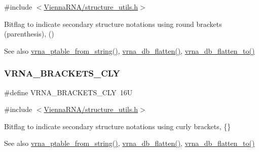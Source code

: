 {\ttfamily \#include $<$\hyperlink{structure__utils_8h}{Vienna\+R\+N\+A/structure\+\_\+utils.\+h}$>$}



Bitflag to indicate secondary structure notations using round brackets (parenthesis), {\ttfamily ()} 

\begin{DoxySeeAlso}{See also}
\hyperlink{group__struct__utils_gac76c9ef3de507748fb0416a59323362b}{vrna\+\_\+ptable\+\_\+from\+\_\+string()}, \hyperlink{group__struct__utils_gae966b9f44168a4f4b39ca42ffb5f37b7}{vrna\+\_\+db\+\_\+flatten()}, \hyperlink{group__struct__utils_ga690425199c8b71545e7196e3af1436f8}{vrna\+\_\+db\+\_\+flatten\+\_\+to()} 
\end{DoxySeeAlso}
\mbox{\label{group__struct__utils_gaf41be40e79cb756c4e0bb8edb4d803d2}} 
\subsubsection{\texorpdfstring{V\+R\+N\+A\+\_\+\+B\+R\+A\+C\+K\+E\+T\+S\+\_\+\+C\+LY}{VRNA\_BRACKETS\_CLY}}
{\footnotesize\ttfamily \#define V\+R\+N\+A\+\_\+\+B\+R\+A\+C\+K\+E\+T\+S\+\_\+\+C\+LY~16U}



{\ttfamily \#include $<$\hyperlink{structure__utils_8h}{Vienna\+R\+N\+A/structure\+\_\+utils.\+h}$>$}



Bitflag to indicate secondary structure notations using curly brackets, {\ttfamily \{\}} 

\begin{DoxySeeAlso}{See also}
\hyperlink{group__struct__utils_gac76c9ef3de507748fb0416a59323362b}{vrna\+\_\+ptable\+\_\+from\+\_\+string()}, \hyperlink{group__struct__utils_gae966b9f44168a4f4b39ca42ffb5f37b7}{vrna\+\_\+db\+\_\+flatten()}, \hyperlink{group__struct__utils_ga690425199c8b71545e7196e3af1436f8}{vrna\+\_\+db\+\_\+flatten\+\_\+to()} 
\end{DoxySeeAlso}
\mbox{\label{group__struct__utils_ga863e03f7f73f10fc9bbcbefbdda4bec8}} 
